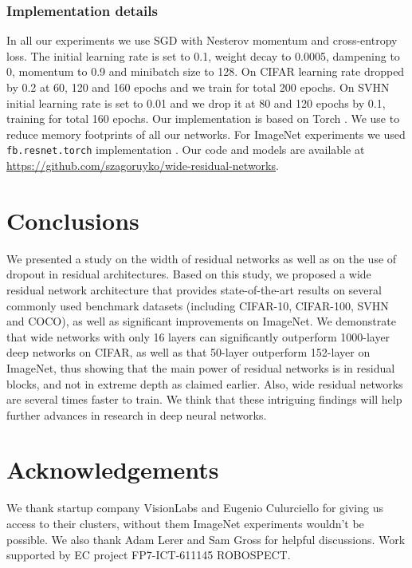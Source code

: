\documentclass{bmvc2k}
\begin{document}
\subsubsection*{Implementation details} In all our experiments we use SGD with Nesterov momentum and cross-entropy loss. The initial learning rate is set to 0.1, weight decay to 0.0005, dampening to 0, momentum to 0.9 and minibatch size to 128. On CIFAR learning rate dropped by 0.2 at 60, 120 and 160 epochs and we train for total 200 epochs. On SVHN initial learning rate is set to 0.01 and we drop it at 80 and 120 epochs by 0.1, training for total 160 epochs. Our implementation is based on Torch \cite{torch}. We use \cite{optimize-net} to reduce memory footprints of all our networks. For ImageNet experiments we used \texttt{fb.resnet.torch} implementation \cite{fb.resnet.torch}. Our code and models are available at \url{https://github.com/szagoruyko/wide-residual-networks}.

\section{Conclusions}

We presented a study on the width of residual networks as well as   on the use of dropout in residual architectures. Based on this study, we  proposed a   wide residual network architecture that provides state-of-the-art results on several commonly used benchmark datasets (including CIFAR-10, CIFAR-100, SVHN and COCO), as well as significant improvements on ImageNet. We demonstrate that wide networks with only 16 layers can significantly outperform 1000-layer deep networks on CIFAR, as well as that 50-layer outperform 152-layer on ImageNet, thus showing that the main power of residual networks is in residual blocks, and not in extreme depth as claimed earlier. Also, wide residual networks are several times faster to train. We think that these intriguing findings will help further advances in research in deep neural networks.

\section{Acknowledgements}

We thank startup company VisionLabs and Eugenio Culurciello for giving us access to their clusters, without them ImageNet experiments wouldn't be possible. We also thank Adam Lerer and Sam Gross for helpful discussions. Work supported by EC project FP7-ICT-611145 ROBOSPECT.


\end{document}
